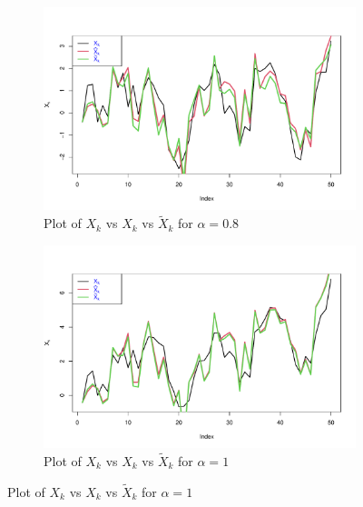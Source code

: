 \documentclass[a4paper, 11pt]{article}
\begin{document}
{\begin{enumerate}[label=(\alph*)]
\begin{figure}[hbt!]
\begin{subfigure}{.475\linewidth}
	\includegraphics[width=\linewidth]{./ass5.2c-0.8.pdf}
	\caption{Plot of $X_k$ vs $\hat{X}_k$ vs $\tilde{X}_k$ for $\alpha=0.8$}
	\label{MLEDdet}
\end{subfigure}\hfill %
\begin{subfigure}{.475\linewidth}
	\includegraphics[width=\linewidth]{./ass5.2c-1.pdf}
	\caption{Plot of $X_k$ vs $\hat{X}_k$ vs $\tilde{X}_k$ for $\alpha=1$}
	\label{energydetPSK}
\end{subfigure}


\end{figure}
\end{enumerate}}
\end{document}
